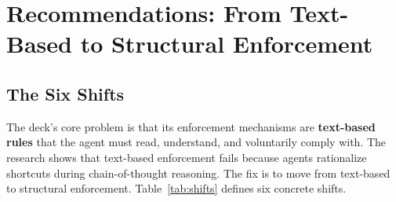 \documentclass[11pt,a4paper]{article}
\begin{document}
\newpage

\section{Recommendations: From Text-Based to Structural Enforcement}

\subsection{The Six Shifts}
\label{sec:shifts}

The deck's core problem is that its enforcement mechanisms are \textbf{text-based rules} that the agent must read, understand, and voluntarily comply with.  The research shows that text-based enforcement fails because agents rationalize shortcuts during chain-of-thought reasoning.  The fix is to move from text-based to structural enforcement.  Table~\ref{tab:shifts} defines six concrete shifts.
\end{document}
